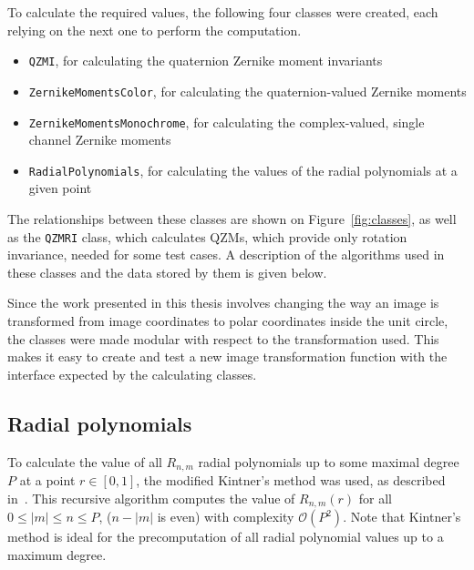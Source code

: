To calculate the required values, the following four classes were created, each relying on the next one to perform the computation.
\begin{itemize}
    \item \texttt{QZMI}, for calculating the quaternion Zernike moment invariants
    \item \texttt{ZernikeMomentsColor}, for calculating the quaternion-valued Zernike moments
    \item \texttt{ZernikeMomentsMonochrome}, for calculating the complex-valued, single channel Zernike moments
    \item \texttt{RadialPolynomials}, for calculating the values of the radial polynomials at a given point
\end{itemize}
The relationships between these classes are shown on Figure~\ref{fig:classes}, as well as the \texttt{QZMRI} class, which calculates QZMs, which provide only rotation invariance, needed for some test cases. A description of the algorithms used in these classes and the data stored by them is given below.

Since the work presented in this thesis involves changing the way an image is transformed from image coordinates to polar coordinates inside the unit circle, the classes were made modular with respect to the transformation used. This makes it easy to create and test a new image transformation function with the interface expected by the calculating classes.

\subsection{Radial polynomials}
To calculate the value of all $R_{n,m}$ radial polynomials up to some maximal degree $P$ at a point $r \in [0,1]$, the modified Kintner's method was used, as described in~\cite{kintner}. This recursive algorithm computes the value of $R_{n,m}(r)$ for all $0 \leq |m| \leq n \leq P$, ($n - |m|$ is even) with complexity $\mathcal{O}(P^2)$. Note that Kintner's method is ideal for the precomputation of all radial polynomial values up to a maximum degree.


